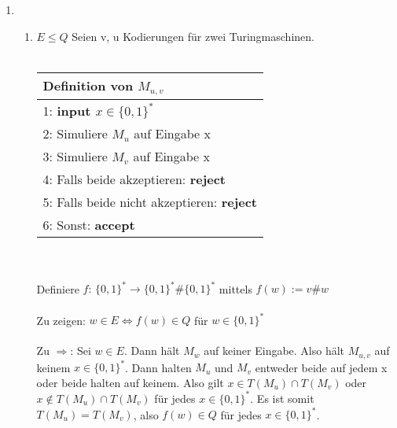 \documentclass[12pt]{scrartcl}
\begin{document}
\exercise{}
\begin{enumerate}
    \item \begin{enumerate}
        \item $E \leq Q$
              Seien v, u Kodierungen für zwei Turingmaschinen.\\\\
              \begin{tabular}[h!]{l}
                \hline
                Definition von $M_{u, v}$\\\hline
                1: \textbf{input $x \in \{0,1\}^*$}\\
                2: Simuliere $M_u$ auf Eingabe x\\
                3: Simuliere $M_v$ auf Eingabe x\\
                4: Falls beide akzeptieren: \textbf{reject}\\
                5: Falls beide nicht akzeptieren: \textbf{reject}\\
                6: Sonst: \textbf{accept}\\\hline
              \end{tabular}\\\\
              Definiere $f: \, \{0,1\}^* \rightarrow \{0,1\}^* \# \{0,1\}^*$ mittels $f(w) := v\#w$\\\\
              Zu zeigen: $w \in E \Longleftrightarrow f(w) \in Q $ für $w \in \{0,1\}^*$\\\\
              Zu $\Rightarrow$: Sei $w \in E$. Dann hält $M_w$ auf keiner Eingabe. Also hält 
              $M_{u,v}$ auf keinem $x \in \{0,1\}^*$. Dann halten $M_u$ und $M_v$ entweder beide auf jedem x oder beide halten auf keinem.
               Also gilt $x \in T(M_u) \cap T(M_v)$ oder $x \notin T(M_u) \cap T(M_v)$ für jedes $x \in \{0,1\}^*$. Es ist somit
               $ T(M_u) = T(M_v)$, also $f(w) \in Q$ für jedes $x \in \{0,1\}^*$.\\
 

\end{enumerate}
\end{enumerate}
\end{document}
